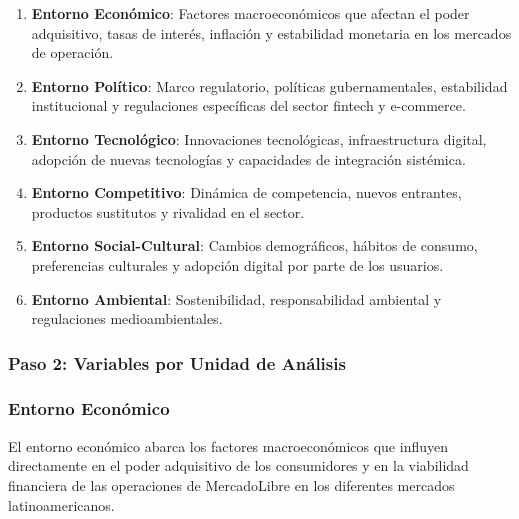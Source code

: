 \begin{enumerate}
\item \textbf{Entorno Económico}: Factores macroeconómicos que afectan el poder adquisitivo, tasas de interés, inflación y estabilidad monetaria en los mercados de operación.
\item \textbf{Entorno Político}: Marco regulatorio, políticas gubernamentales, estabilidad institucional y regulaciones específicas del sector fintech y e-commerce.
\item \textbf{Entorno Tecnológico}: Innovaciones tecnológicas, infraestructura digital, adopción de nuevas tecnologías y capacidades de integración sistémica.
\item \textbf{Entorno Competitivo}: Dinámica de competencia, nuevos entrantes, productos sustitutos y rivalidad en el sector.
\item \textbf{Entorno Social-Cultural}: Cambios demográficos, hábitos de consumo, preferencias culturales y adopción digital por parte de los usuarios.
\item \textbf{Entorno Ambiental}: Sostenibilidad, responsabilidad ambiental y regulaciones medioambientales.
\end{enumerate}

\subsubsection{Paso 2: Variables por Unidad de Análisis}

\subsubsection{Entorno Económico}

El entorno económico abarca los factores macroeconómicos que influyen directamente en el poder adquisitivo de los consumidores y en la viabilidad financiera de las operaciones de MercadoLibre en los diferentes mercados latinoamericanos.

